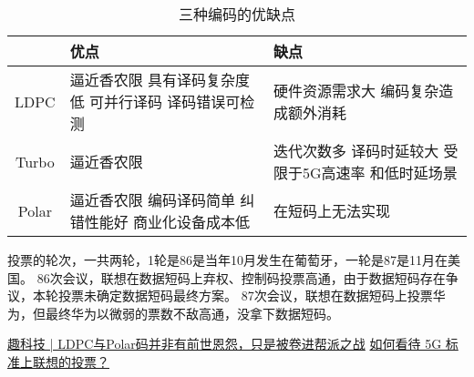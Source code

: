 \documentclass{ctexart}
\begin{document}
\begin{table}[!ht]
    \centering
    \begin{tabular}{cp{4cm}p{4cm}}
        \hline
            & 优点 & 缺点 \\
        \hline
        LDPC & 逼近香农限 \newline
               具有译码复杂度低 \newline
               可并行译码 \newline
               译码错误可检测
             & 硬件资源需求大 \newline
               编码复杂造成额外消耗 \\
        \hline
        Turbo & 逼近香农限 \newline
        & 迭代次数多 \newline 译码时延较大 \newline
        受限于5G高速率 \newline 和低时延场景 \\
        \hline
        Polar & 逼近香农限 \newline
        编码译码简单 \newline
        纠错性能好 \newline
        商业化设备成本低 & 在短码上无法实现 \\
        \hline
    \end{tabular}
    \caption{三种编码的优缺点\cite{a}}
\end{table}
投票的轮次，一共两轮，1轮是86是当年10月发生在葡萄牙，一轮是87是11月在美国。
86次会议，联想在数据短码上弃权、控制码投票高通，由于数据短码存在争议，本轮投票未确定数据短码最终方案。
87次会议，联想在数据短码上投票华为，但最终华为以微弱的票数不敌高通，没拿下数据短码。\cite{b}
\begin{thebibliography}{9}
     \href{http://www.eefocus.com/communication/373020/r1}{趣科技 | LDPC与Polar码并非有前世恩怨，只是被卷进帮派之战}
     \href{https://www.zhihu.com/question/276752269}{如何看待 5G 标准上联想的投票？}
\end{thebibliography}
\end{document}
